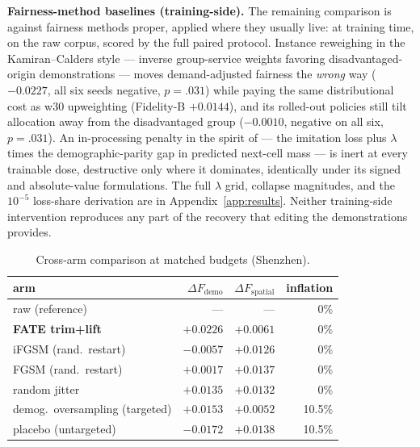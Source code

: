 \textbf{Fairness-method baselines (training-side).} The remaining comparison
is against fairness methods proper, applied where they usually live: at
training time, on the raw corpus, scored by the full paired protocol.
Instance reweighing in the Kamiran--Calders style
\cite{kamirancalders2012} --- inverse group-service weights favoring
disadvantaged-origin demonstrations --- moves demand-adjusted fairness the
\emph{wrong} way ($-0.0227$, all six seeds negative, $p = .031$) while
paying the same distributional cost as w30 upweighting (Fidelity-B
$+0.0144$), and its rolled-out policies still tilt allocation away from the %
disadvantaged group ($-0.0010$, negative on all six, $p = .031$). An
in-processing penalty
in the spirit of \cite{zheng2023} --- the imitation loss plus $\lambda$
times the demo\-graph\-ic-parity gap in predicted next-cell mass --- is inert at
every trainable dose, destructive only where it dominates, identically
under its signed and absolute-value formulations. The full $\lambda$ grid,
collapse magnitudes, and the $10^{-5}$ loss-share derivation are in
Appendix~\ref{app:results}.
Neither training-side intervention reproduces any part of the recovery
that editing the demonstrations provides.

\begin{table}[t]
\centering
\caption{Cross-arm comparison at matched budgets (Shenzhen).}
\label{tab:baselines}
\footnotesize
\setlength{\tabcolsep}{4pt}
\begin{tabular}{lrrr}
\toprule
arm & $\Delta F_{\mathrm{demo}}$ & $\Delta F_{\mathrm{spatial}}$ & inflation \\
\midrule
raw (reference) & --- & --- & 0\% \\
\textbf{FATE trim+lift} & $\mathbf{+0.0226}$ & $+0.0061$ & 0\% \\
iFGSM (rand.\ restart) & $-0.0057$ & $+0.0126$ & 0\% \\
FGSM (rand.\ restart) & $+0.0017$ & $+0.0137$ & 0\% \\
random jitter & $+0.0135$ & $+0.0132$ & 0\% \\
demog.\ oversampling (targeted) & $+0.0153$ & $+0.0052$ & 10.5\% \\
\quad placebo (untargeted) & $-0.0172$ & $+0.0138$ & 10.5\% \\
\bottomrule
\end{tabular}
\end{table}

